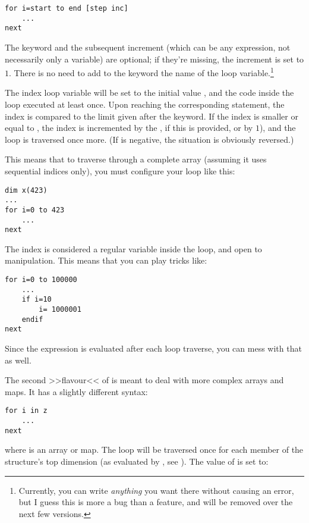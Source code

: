 \begin{lstlisting}
for i=start to end [step inc]
	...
next
\end{lstlisting}

The  keyword and the subsequent increment  (which can
be any expression, not necessarily only a variable) are optional; if they're
missing, the increment is set to $1$. There is no need to add to the
 keyword the name of the loop variable.\footnote{Currently, you
can write \emph{anything} you want there without causing an error, but I
guess this is more a bug than a feature, and will be removed over the
next few versions.}

The index loop variable  will be set to the initial value
, and the code inside the loop executed at least once. Upon
reaching the corresponding  statement, the index is compared to
the limit  given after the  keyword. If the index is
smaller or equal to , the index is incremented by the ,
if this is provided, or by $1$), and the loop is traversed once more.
(If  is negative, the situation is obviously reversed.)

This means that to traverse through a complete array (assuming it uses
sequential indices only), you must configure your loop like this:

\begin{lstlisting}
dim x(423)
...
for i=0 to 423
	...
next
\end{lstlisting}

The index is considered a regular variable inside the loop, and open to
manipulation. This means that you can play tricks like:

\begin{lstlisting}
for i=0 to 100000
	...
	if i=10
		i= 1000001
	endif
next
\end{lstlisting}

Since the  expression is evaluated after each loop traverse, you can
mess with that as well.

The second >>flavour<< of  is meant to deal with more complex
arrays and maps. It has a slightly different syntax:

\begin{lstlisting}
for i in z
	...
next
\end{lstlisting}

where  is an array or map. The  loop will be traversed
once for each member of the structure's top dimension (as evaluated by , see
). The value of  is set to:

